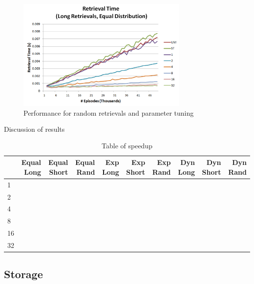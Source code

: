 \documentclass[11pt]{article} %
\begin{document}
\begin{figure}[h]
\caption{Performance for random retrievals and parameter tuning}
\centering
\includegraphics[width=0.75\textwidth]{images/ret_worst_eq}
\end{figure}

Discussion of results

\begin{table}[h]
\caption{Table of speedup}
\centering
    \begin{tabular}{|l|r|r|r|r|r|r|r|r|r|}
        \hline
        ~  & Equal Long & Equal Short & Equal Rand & Exp Long & Exp Short & Exp Rand & Dyn Long & Dyn Short & Dyn Rand \\ \hline
        1  & ~          & ~           & ~          & ~        & ~         & ~        & ~        & ~         & ~        \\  \hline
        2  & ~          & ~           & ~          & ~        & ~         & ~        & ~        & ~         & ~        \\ \hline
        4  & ~          & ~           & ~          & ~        & ~         & ~        & ~        & ~         & ~        \\ \hline
        8  & ~          & ~           & ~          & ~        & ~         & ~        & ~        & ~         & ~        \\ \hline
        16 & ~          & ~           & ~          & ~        & ~         & ~        & ~        & ~         & ~        \\ \hline
        32 & ~          & ~           & ~          & ~        & ~         & ~        & ~        & ~         & ~        \\
        \hline
    \end{tabular}
\end{table}

\subsection{Storage}
\end{document}
